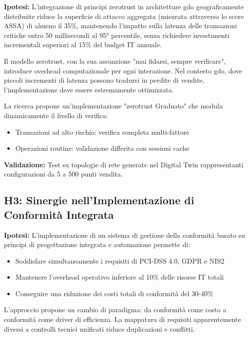 \textbf{Ipotesi:} L'integrazione di principi \gls{zerotrust} in architetture \gls{gdo} geograficamente distribuite riduce la superficie di attacco aggregata (misurata attraverso lo score ASSA) di almeno il 35\%, mantenendo l'impatto sulla latenza delle transazioni critiche entro 50 millisecondi al 95° percentile, senza richiedere investimenti incrementali superiori al 15\% del budget IT annuale.

Il modello \gls{zerotrust}, con la sua assunzione "mai fidarsi, sempre verificare", introduce overhead computazionale per ogni interazione. Nel contesto \gls{gdo}, dove piccoli incrementi di latenza possono tradursi in perdite di vendite, l'implementazione deve essere estremamente ottimizzata.

La ricerca propone un'implementazione "\gls{zerotrust} Graduato" che modula dinamicamente il livello di verifica:
\begin{itemize}
\item Transazioni ad alto rischio: verifica completa multi-fattore
\item Operazioni routine: validazione differita con sessioni cache
\end{itemize}

\textbf{Validazione:} Test su topologie di rete generate nel Digital Twin rappresentanti configurazioni da 5 a 500 punti vendita.

\subsection{\texorpdfstring{H3: Sinergie nell'Implementazione di Conformità Integrata}{1.4.3 - H3: Sinergie nell'Implementazione di Conformità Integrata}}
\label{subsec:h3}

\textbf{Ipotesi:} L'implementazione di un sistema di gestione della conformità basato su principi di progettazione integrata e automazione permette di:
\begin{itemize}
\item Soddisfare simultaneamente i requisiti di PCI-DSS 4.0, GDPR e NIS2
\item Mantenere l'overhead operativo inferiore al 10\% delle risorse IT totali
\item Conseguire una riduzione dei costi totali di conformità del 30-40\%
\end{itemize}

L'approccio propone un cambio di paradigma: da conformità come costo a conformità come driver di efficienza. La mappatura di requisiti apparentemente diversi a controlli tecnici unificati riduce duplicazioni e conflitti.

